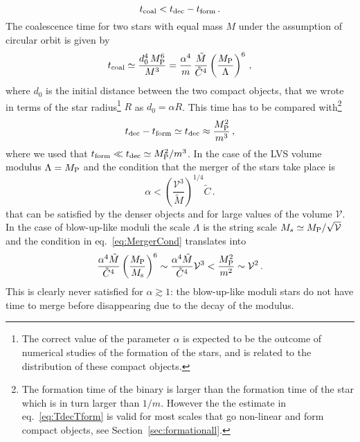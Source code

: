 \documentclass[11pt,a4paper]{article}
\newcommand{\V}{\mathcal{V}}
\begin{document}
\begin{equation}
\label{eq:MergerCond}
t_{\rm coal} < t_{\rm dec} - t_{\rm form} \,.
\end{equation}
The coalescence time for two stars with equal mass $M$ under the assumption of circular orbit is given by~\cite{Maggiore:1900zz}
\begin{equation}
t_{\rm coal} \simeq  \frac{d_0^4 \, M_{\rm P}^6}{M^3} = \frac{\alpha^4}{m} \, \frac{\tilde{M}}{\tilde{C}^4} \left(\frac{M_{\rm P}}{\Lambda}\right)^6 \,,
\end{equation}
where $d_0$ is the initial distance between the two compact objects, that we wrote in terms of the star radius\footnote{The correct value of the parameter $\alpha$ is expected to be the outcome of numerical studies of the formation of the stars, and is related to the distribution of these compact objects.} $R$ as $d_0 = \alpha R$. This time has to be compared with\footnote{The formation time of the binary is larger than the formation time of the star which is in turn larger than $1/m$. However the the estimate in eq.~\eqref{eq:TdecTform} is valid for most scales that go non-linear and form compact objects, see Section~\ref{sec:formationall}.}
\begin{equation}
\label{eq:TdecTform}
t_{\rm dec} - t_{\rm form} \simeq t_{\rm dec} \approx \frac{M_{\rm P}^2}{m^3} \,,
\end{equation}
where we used that $t_{\rm form} \ll t_{\rm dec} \simeq M_{\rm P}^2/m^3$. In the case of the LVS volume modulus $\Lambda = M_{\rm P}$ and the condition that the merger of the stars take place is
\begin{equation}
\label{eq:AlphaBound}
\alpha < \left(\frac{\V^3}{\tilde{M}}\right)^{1/4} \tilde{C} \,.
\end{equation}
that can be satisfied by the denser objects and for large values of the volume $\V$. In the case of blow-up-like moduli the scale $\Lambda$ is the string scale $M_s \simeq M_{\rm P}/\sqrt{\V}$ and the condition in eq.~\eqref{eq:MergerCond} translates into
\begin{equation}
\frac{\alpha^4 \tilde{M}}{\tilde{C}^4} \left(\frac{M_{\rm P}}{M_{\rm s}}\right)^6 \sim \frac{\alpha^4 \tilde{M}}{\tilde{C}^4} \V^3  < \frac{M_{\rm P}^2}{m^2} \sim \V^2 \,.
\end{equation}
This is clearly never satisfied for $\alpha \gtrsim 1$: the blow-up-like moduli stars do not have time to merge before disappearing due to the decay of the modulus.\\
\end{document}
